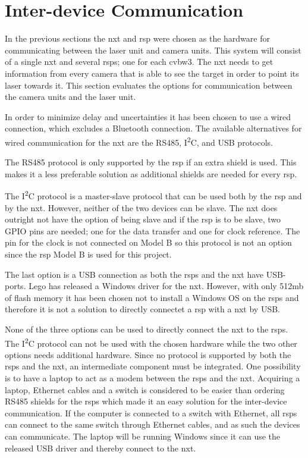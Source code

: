 \section{Inter-device Communication}
In the previous sections the \gls{nxt} and \gls{rsp} were chosen as the hardware for communicating between the laser unit and camera units. This system will consist of a single \gls{nxt} and several \glspl{rsp}; one for each \gls{cvbw3}. The \gls{nxt} needs to get information from every camera that is able to see the target in order to point its laser towards it. This section evaluates the options for communication between the camera units and the laser unit.

In order to minimize delay and uncertainties it has been chosen to use a wired connection, which excludes a Bluetooth connection. The available alternatives for wired communication for the \gls{nxt} are the RS485, I\textsuperscript{2}C, and USB protocols\cite{lego_hardware}.

The RS485 protocol is only supported by the \gls{rsp} if an extra shield is used\cite{rs485_shield}. This makes it a less preferable solution as additional shields are needed for every \gls{rsp}.

The I\textsuperscript{2}C protocol is a master-slave protocol that can be used both by the \gls{rsp} and by the \gls{nxt}. However, neither of the two devices can be slave. The \gls{nxt} does outright not have the option of being slave\cite{lego_hardware} and if the \gls{rsp} is to be slave, two GPIO pins are needed; one for the data transfer and one for clock reference. The pin for the clock is not connected on Model B\cite{pi_gpio_1}\cite{pi_gpio_2} so this protocol is not an option since the \gls{rsp} Model B is used for this project.

The last option is a USB connection as both the \glspl{rsp} and the \gls{nxt} have USB-ports. Lego has released a Windows driver for the \gls{nxt}\cite{lego_driver}. However, with only 512mb of flash memory it has been chosen not to install a Windows OS on the \glspl{rsp} and therefore it is not a solution to directly connectet a \gls{rsp} with a \gls{nxt} by USB.  

None of the three options can be used to directly connect the \gls{nxt} to the \glspl{rsp}. The I\textsuperscript{2}C protocol can not be used with the chosen hardware while the two other options needs additional hardware. Since no protocol is supported by both the \glspl{rsp} and the \gls{nxt}, an intermediate component must be integrated. One possibility is to have a laptop to act as a modem between the \glspl{rsp} and the \gls{nxt}. Acquiring a laptop, Ethernet cables and a switch is considered to be easier than ordering RS485 shields for the \glspl{rsp} which made it an easy solution for the inter-device communication. If the computer is connected to a switch with Ethernet, all \glspl{rsp} can connect to the same switch through Ethernet cables, and as such the devices can communicate. The laptop will be running Windows since it can use the released USB driver and thereby connect to the \gls{nxt}. 